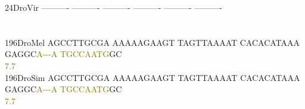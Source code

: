 \documentclass[11pt,twoside,reqno,a4paper]{article}
\begin{document}
{24\hspace*{2\charwidth}DroVir	----------	----------	----------	----------	----------	----------	\\
\hspace*{4\charwidth}\hspace*{7\charwidth}\hspace*{1\charwidth}\hspace*{1\charwidth}\hspace*{1\charwidth}\hspace*{1\charwidth}\hspace*{1\charwidth}\hspace*{1\charwidth}\\
\\
196\hspace*{1\charwidth}DroMel	AGCCTTGCGA	AAAAAGAAGT	TAGTTAAAAT	CACACATAAA	GAGGC\textcolor{olive}{A}\textcolor{olive}{-}\textcolor{olive}{-}\textcolor{olive}{-}\textcolor{olive}{A}	\textcolor{olive}{T}\textcolor{olive}{G}\textcolor{olive}{C}\textcolor{olive}{C}\textcolor{olive}{A}\textcolor{olive}{A}\textcolor{olive}{T}\textcolor{olive}{G}GC	\\
\hspace*{4\charwidth}\hspace*{7\charwidth}\hspace*{1\charwidth}\hspace*{1\charwidth}\hspace*{1\charwidth}\hspace*{1\charwidth}\hspace*{45\charwidth}\textcolor{olive}{7.7}\hspace*{1\charwidth}\hspace*{1\charwidth}\\
196\hspace*{1\charwidth}DroSim	AGCCTTGCGA	AAAAAGAAGT	TAGTTAAAAT	CACACATAAA	GAGGC\textcolor{olive}{A}\textcolor{olive}{-}\textcolor{olive}{-}\textcolor{olive}{-}\textcolor{olive}{A}	\textcolor{olive}{T}\textcolor{olive}{G}\textcolor{olive}{C}\textcolor{olive}{C}\textcolor{olive}{A}\textcolor{olive}{A}\textcolor{olive}{T}\textcolor{olive}{G}GC	\\
\hspace*{4\charwidth}\hspace*{7\charwidth}\hspace*{1\charwidth}\hspace*{1\charwidth}\hspace*{1\charwidth}\hspace*{1\charwidth}\hspace*{45\charwidth}\textcolor{olive}{7.7}\hspace*{1\charwidth}\hspace*{1\charwidth}\\
}
\end{document}

